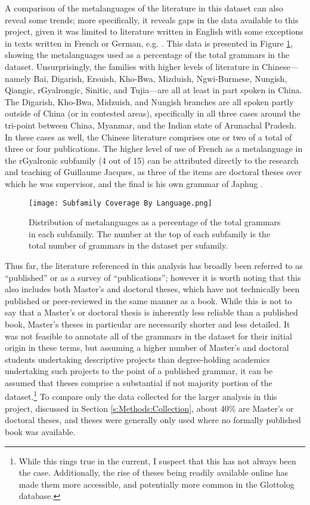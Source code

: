 A comparison of the metalanguages of the literature in this dataset can also reveal some trends; more specifically, it reveals gaps in the data available to this project, given it was limited to literature written in English with some exceptions in texts written in French or German, e.g. . This data is presented in Figure \ref{f:Description:SubfamilyCoverageByLanguage}, showing the metalanguages used as a percentage of the total grammars in the dataset. Unsurprisingly, the families with higher levels of literature in Chinese---namely Bai, Digarish, Ersuish, Kho-Bwa, Mizduish, Ngwi-Burmese, Nungish, Qiangic, rGyalrongic, Sinitic, and Tujia---are all at least in part spoken in China. The Digarish, Kho-Bwa, Midzuish, and Nungish branches are all spoken partly outside of China (or in contested areas), specifically in all three cases around the tri-point between China, Myanmar, and the Indian state of Arunachal Pradesh. In these cases as well, the Chinese literature comprises one or two of a total of three or four publications. The higher level of use of French as a metalanguage in the rGyalronic subfamily (4 out of 15) can be attributed directly to the research and teaching of Guillaume Jacques, as three of the items are doctoral theses over which he was supervisor, and the final is his own grammar of Japhug \cite{Jacques2021}.

\begin{figure}
        \centering
        \texttt{[image: Subfamily Coverage By Language.png]}
        \caption{Distribution of metalanguages as a percentage of the total grammars in each subfamily. The number at the top of each subfamily is the total number of grammars in the dataset per sufamily.}\label{f:Description:SubfamilyCoverageByLanguage}
\end{figure}

Thus far, the literature referenced in this analysis has broadly been referred to as ``published'' or as a survey of ``publications''; however it is worth noting that this also includes both Master's and doctoral theses, which have not technically been published or peer-reviewed in the same manner as a book. While this is not to say that a Master's or doctoral thesis is inherently less reliable than a published book, Master's theses in particular are necessarily shorter and less detailed. It was not feasible to annotate all of the grammars in the dataset for their initial origin in these terms, but assuming a higher number of Master's and doctoral students undertaking descriptive projects than degree-holding academics undertaking such projects to the point of a published grammar, it can be assumed that theses comprise a substantial if not majority portion of the dataset.\footnote{While this rings true in the current, I suspect that this has not always been the case. Additionally, the rise of theses being readily available online has made them more accessible, and potentially more common in the Glottolog database.} To compare only the data collected for the larger analysis in this project, discussed in Section \ref{s:Methods:Collection}, about 40\% are Master's or doctoral theses, and theses were generally only used where no formally published book was available.

